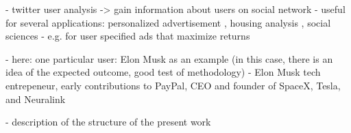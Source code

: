- twitter user analysis -> gain information about users on social network
- useful for several applications: personalized advertisement \cite{advertisement_2016}, housing analysis \cite{home_2012}, social sciences \cite{socialscience_2018}
- e.g. for user specified ads that maximize returns

- here: one particular user: Elon Musk as an example (in this case, there is an idea of the expected outcome, good test of methodology)
- Elon Musk tech entrepeneur, early contributions to PayPal, CEO and founder of SpaceX, Tesla, and Neuralink \cite{musk}\cite{musk_2015}

- description of the structure of the present work